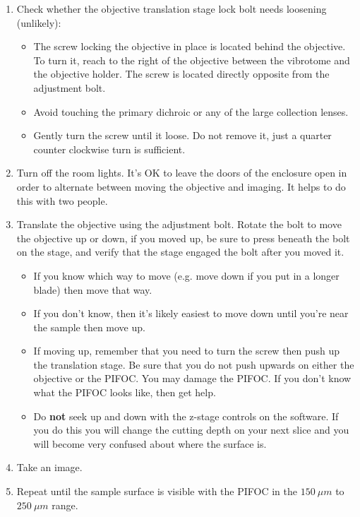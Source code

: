 \documentclass[paper=a4, fontsize=11pt]{scrartcl} %
\numberwithin{equation}{section} %
\numberwithin{figure}{section} %
\numberwithin{table}{section} %
\begin{document}
\begin{enumerate}
\item Check whether the objective translation stage lock bolt needs loosening (unlikely):

\begin{itemize}
\item The screw locking the objective in place is located behind the objective. To
turn it, reach to the right of the objective between the vibrotome and the objective holder. 
The screw is located directly opposite from the adjustment bolt.

\item Avoid touching the primary dichroic or any of the large collection lenses.

\item Gently turn the screw until it loose. Do not remove it, just a quarter counter clockwise turn is sufficient.
\end{itemize}

\item Turn off the room lights. It's OK to leave the doors of the enclosure open in order to alternate between moving the objective and imaging.
It helps to do this with two people. 

\item Translate the objective using the adjustment bolt. Rotate the bolt to move the objective up or down, if you moved up, be sure to press beneath the bolt on the stage, and verify that the stage engaged the bolt after you moved it.
\begin{itemize}
\item If you know which way to move (e.g. move down if you put in a longer blade) then move that way.
\item If you don't know, then it's likely easiest to move down until you're near the sample then move up.
\item If moving up, remember that you need to turn the screw then push up the translation stage. 
Be sure that you do not push upwards on either the objective or the PIFOC. 
You may damage the PIFOC. 
If you don't know what the PIFOC looks like, then get help.

\item Do \textbf{not} seek up and down with the z-stage controls on the software. 
If you do this you will change the cutting depth on your next slice and you will become very confused about where the surface is. 

\end{itemize}

\item Take an image. 

\item Repeat until the sample surface is visible with the PIFOC in the $150~\mu m$ to $250~\mu m$ range.

\end{enumerate}
\end{document}
